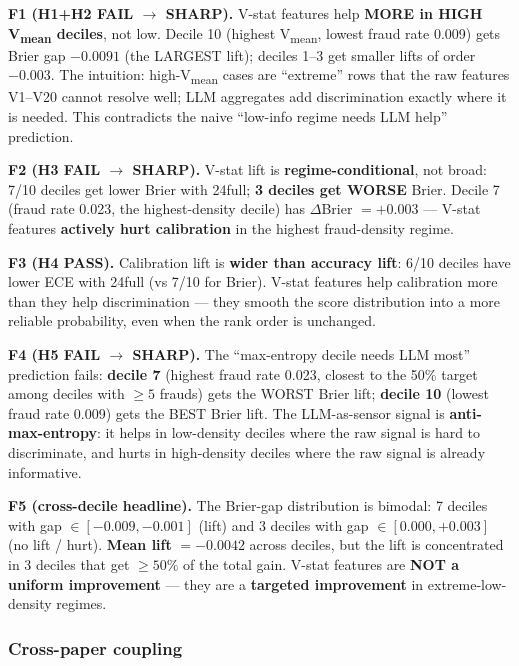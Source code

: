 \documentclass{article}
\begin{document}
\textbf{F1 (H1+H2 FAIL $\rightarrow$ SHARP).}
V-stat features help \textbf{MORE in HIGH V\textsubscript{mean} deciles}, not low.
Decile 10 (highest V\textsubscript{mean}, lowest fraud rate 0.009) gets
Brier gap $-0.0091$ (the LARGEST lift); deciles 1--3 get smaller lifts
of order $-0.003$. The intuition: high-V\textsubscript{mean} cases are
``extreme'' rows that the raw features V1--V20 cannot resolve well; LLM
aggregates add discrimination exactly where it is needed. This
contradicts the naive ``low-info regime needs LLM help'' prediction.

\textbf{F2 (H3 FAIL $\rightarrow$ SHARP).}
V-stat lift is \textbf{regime-conditional}, not broad: 7/10 deciles get
lower Brier with 24full; \textbf{3 deciles get WORSE} Brier. Decile 7
(fraud rate 0.023, the highest-density decile) has $\Delta$Brier $= +0.003$
--- V-stat features \textbf{actively hurt calibration} in the highest
fraud-density regime.

\textbf{F3 (H4 PASS).}
Calibration lift is \textbf{wider than accuracy lift}: 6/10 deciles have
lower ECE with 24full (vs 7/10 for Brier). V-stat features help calibration
more than they help discrimination --- they smooth the score distribution
into a more reliable probability, even when the rank order is unchanged.

\textbf{F4 (H5 FAIL $\rightarrow$ SHARP).}
The ``max-entropy decile needs LLM most'' prediction fails:
\textbf{decile 7} (highest fraud rate 0.023, closest to the 50\% target
among deciles with $\geq 5$ frauds) gets the WORST Brier lift; \textbf{decile 10}
(lowest fraud rate 0.009) gets the BEST Brier lift. The LLM-as-sensor
signal is \textbf{anti-max-entropy}: it helps in low-density deciles
where the raw signal is hard to discriminate, and hurts in high-density
deciles where the raw signal is already informative.

\textbf{F5 (cross-decile headline).}
The Brier-gap distribution is bimodal: 7 deciles with gap
$\in [-0.009, -0.001]$ (lift) and 3 deciles with gap $\in [0.000, +0.003]$
(no lift / hurt). \textbf{Mean lift} $= -0.0042$ across deciles, but the
lift is concentrated in 3 deciles that get $\geq 50\%$ of the total
gain. V-stat features are \textbf{NOT a uniform improvement} --- they are
a \textbf{targeted improvement} in extreme-low-density regimes.

\subsubsection{Cross-paper coupling}\label{sec:p8-iter192-coupling}
\end{document}
